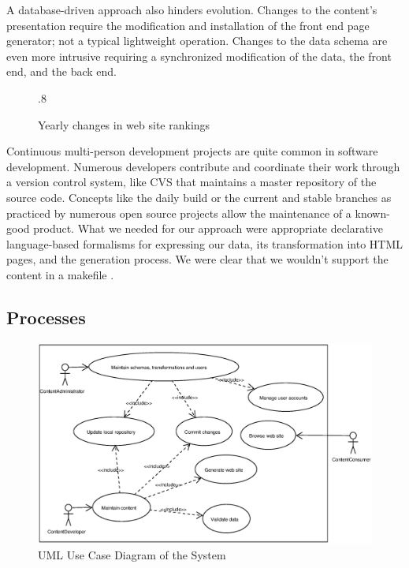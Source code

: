 \documentclass[10pt]{article}
\def\epsfsize#1#2{\ifdim#1>\columnwidth\columnwidth\else#1\fi}
\begin{document}
A database-driven approach also hinders evolution.
Changes to the content's presentation require the modification
and installation of the front end page generator;
not a typical lightweight operation.
Changes to the data schema are even more intrusive
requiring a synchronized modification of the data,
the front end, and the back end.

\label{sec:design}
\begin{figure}[h!]
\begin{center}
\leavevmode
\def\epsfsize#1#2{\epsfxsize}
\epsfysize.8\vsize
{}
\end{center}
\caption{Yearly changes in web site rankings}
\label{fig:rankyear}
\end{figure}

Continuous multi-person development projects are quite
common in software development.
Numerous developers contribute and coordinate their work
through a version control system, like CVS that
maintains a master repository of the source code.
Concepts like the daily build \cite{CS95b} or the
current and stable branches as practiced by
numerous open source projects allow the maintenance
of a known-good product.
What we needed for our approach were appropriate
declarative language-based formalisms for expressing our data,
its transformation into HTML pages, and the
generation process. We were clear that we wouldn't support the content in a makefile \cite{OTT91}.

\subsection{Processes}

\begin{figure}[h!]
\includegraphics[scale=0.5]{use-case-diagram}
\caption{UML Use Case Diagram of the System}
\label{fig:use-case-diagram}
\end{figure}
\end{document}
